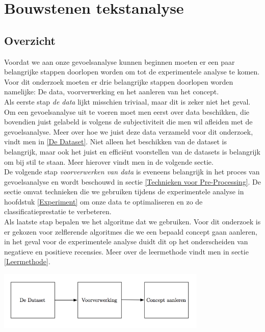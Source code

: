 \chapter{Bouwstenen tekstanalyse}\label{Lectuur}

\section{Overzicht}\label{Overzicht}

Voordat we aan onze gevoelsanalyse kunnen beginnen moeten er een paar belangrijke stappen doorlopen worden om tot de experimentele analyse te komen. Voor dit onderzoek moeten er drie belangrijke stappen doorlopen worden namelijke: De data, voorverwerking en het aanleren van het concept.\\

Als eerste stap \textit{de data} lijkt misschien triviaal, maar dit is zeker niet het geval. Om een gevoelsanalyse uit te voeren moet men eerst over data beschikken, die bovendien juist gelabeld is volgens de subjectiviteit die men wil afleiden met de gevoelsanalyse. Meer over hoe we juist deze data verzameld voor dit onderzoek, vindt men in \ref{De Dataset}. Niet alleen het beschikken van de dataset is belangrijk, maar ook het juist en effici\"ent voorstellen van de datasets is belangrijk om bij stil te staan. Meer hierover vindt men in de volgende sectie.\\

De volgende stap \textit{voorverwerken van data}  is eveneens belangrijk in het proces van gevoelsanalyse en wordt beschouwd in sectie \ref{Technieken voor Pre-Processing}. De sectie omvat technieken die we gebruiken tijdens de experimentele analyse in hoofdstuk \ref{Experiment} om onze data te optimaliseren en zo de classificatieprestatie te verbeteren.\\

Als laatste stap bepalen we het algoritme dat we gebruiken. Voor dit onderzoek is  er gekozen voor zelflerende algoritmes die we een bepaald concept gaan aanleren, in het geval voor de experimentele analyse duidt dit op het onderscheiden van negatieve en positieve recensies. Meer over de leermethode vindt men in sectie \ref{Leermethode}.

\begin{center}
  \includegraphics[width=10cm]{overzicht}
  \label{fig:beslissingsboom}
\end{center}

